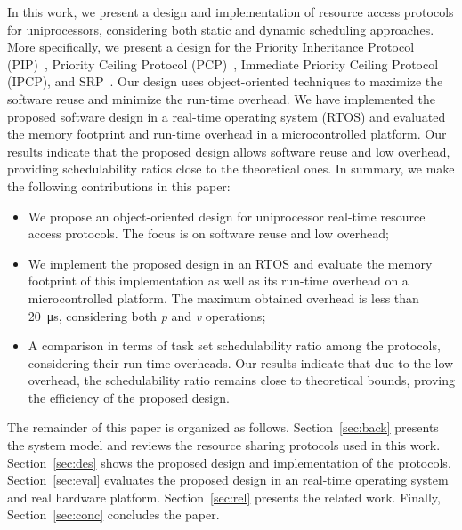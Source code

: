 In this work, we present a design and implementation of resource access 
protocols for uniprocessors, considering both static and dynamic scheduling 
approaches. More specifically, we present a design for the Priority Inheritance 
Protocol (PIP)~\cite{Sha:1990}, Priority Ceiling Protocol 
(PCP)~\cite{Sha:1990}, Immediate Priority Ceiling Protocol (IPCP), and 
SRP~\cite{Baker:1991}. Our design uses object-oriented techniques to 
maximize the software reuse and minimize the run-time overhead. We have 
implemented the proposed software design in a real-time operating system (RTOS) 
and evaluated the memory footprint and run-time overhead in a microcontrolled 
platform. Our results indicate that the proposed design allows software reuse 
and low overhead, providing schedulability ratios close to the theoretical 
ones. 
In summary, we make the following contributions in this paper:

\begin{itemize}
 \item We propose an object-oriented design for uniprocessor real-time resource 
access protocols. The focus is on software reuse and low overhead;
 \item We implement the proposed design in an RTOS and evaluate the memory 
footprint of this implementation as well as its run-time overhead on a 
microcontrolled platform. The maximum obtained overhead is less than 
20~\si{\micro\second}, considering both \emph{p} and \emph{v} operations;
 \item A comparison in terms of task set schedulability ratio among the 
protocols, considering their run-time overheads. Our results indicate that due 
to the low overhead, the schedulability ratio remains close to theoretical 
bounds, proving the efficiency of the proposed design.
\end{itemize}

The remainder of this paper is organized as follows. Section~\ref{sec:back} 
presents the system model and reviews the resource sharing protocols used in 
this work. Section~\ref{sec:des} shows the proposed design and implementation 
of the protocols. Section~\ref{sec:eval} evaluates the proposed design in an 
real-time operating system and real hardware platform. Section~\ref{sec:rel} 
presents the related work. Finally, Section~\ref{sec:conc} concludes the paper.
